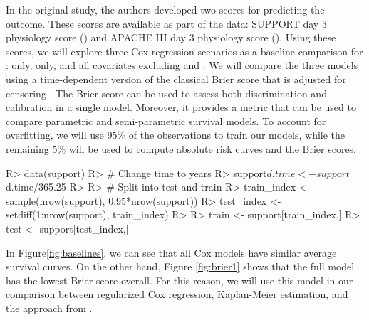 \documentclass[
]{jss}
\begin{document}
In the original study, the authors developed two scores for predicting
the outcome. These scores are available as part of the data: SUPPORT day
3 physiology score () and APACHE III day 3 physiology score
(). Using these scores, we will explore three Cox regression
scenarios as a baseline comparison for :  only,
 only, and all covariates excluding  and .
We will compare the three models using a time-dependent version of the
classical Brier score that is adjusted for censoring
\citep{graf1999ass}. The Brier score can be used to assess both
discrimination and calibration in a single model. Moreover, it provides
a metric that can be used to compare parametric and semi-parametric
survival models. To account for overfitting, we will use 95\% of the
observations to train our models, while the remaining 5\% will be used
to compute absolute risk curves and the Brier scores.

\begin{CodeChunk}

\begin{CodeInput}
R> data(support)
R> # Change time to years
R> support$d.time <- support$d.time/365.25
R> 
R> # Split into test and train
R> train_index <- sample(nrow(support), 0.95*nrow(support))
R> test_index <- setdiff(1:nrow(support), train_index)
R> 
R> train <- support[train_index,]
R> test <- support[test_index,]
\end{CodeInput}
\end{CodeChunk}

In Figure\ref{fig:baselines}, we can see that all Cox models have
similar average survival curves. On the other hand, Figure
\ref{fig:brier1} shows that the full model has the lowest Brier score
overall. For this reason, we will use this model in our comparison
between regularized Cox regression, Kaplan-Meier estimation, and the
approach from .
\end{document}
